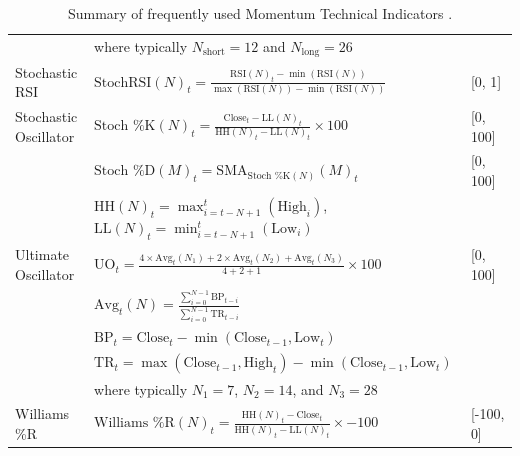 \begin{table}[htb!]
\begin{tabularx}{\textwidth}{@{}lXl@{}}
\addlinespace
& where typically $N_{\text{short}} = 12$ and $N_{\text{long}} = 26$ & \\
\addlinespace
Stochastic RSI & $\text{StochRSI}(N)_t = \frac{\text{RSI}(N)_t - \min(\text{RSI}(N))}{\max(\text{RSI}(N)) - \min(\text{RSI}(N))}$ & [0, 1] \\
\addlinespace
Stochastic Oscillator & $\text{Stoch \%K}(N)_t = \frac{\text{Close}_t - \text{LL}(N)_t}{\text{HH}(N)_t - \text{LL}(N)_t} \times 100$ & [0, 100] \\
\addlinespace
& $\text{Stoch \%D}(M)_t = \text{SMA}_{\text{Stoch \%K}(N)}(M)_t$ & [0, 100] \\
\addlinespace
& $\text{HH}(N)_t = \max_{i=t-N+1}^{t}(\text{High}_i)$, $\text{LL}(N)_t = \min_{i=t-N+1}^{t}(\text{Low}_i)$ & \\
\addlinespace
Ultimate Oscillator & $\text{UO}_t = \frac{4 \times \text{Avg}_t(N_1) + 2 \times \text{Avg}_t(N_2) + \text{Avg}_t(N_3)}{4+2+1} \times 100$ & [0, 100] \\
\addlinespace
& $\text{Avg}_t(N) = \frac{\sum_{i=0}^{N-1}\text{BP}_{t-i}}{\sum_{i=0}^{N-1}\text{TR}_{t-i}}$ & \\
\addlinespace
& $\text{BP}_t = \text{Close}_t - \min(\text{Close}_{t-1}, \text{Low}_t)$ & \\
\addlinespace
& $\text{TR}_t = \max(\text{Close}_{t-1}, \text{High}_t) - \min(\text{Close}_{t-1}, \text{Low}_t)$ & \\
\addlinespace
& where typically $N_1 = 7$, $N_2 = 14$, and $N_3 = 28$ & \\
\addlinespace
Williams \%R & $\text{Williams \%R}(N)_t = \frac{\text{HH}(N)_t - \text{Close}_t}{\text{HH}(N)_t - \text{LL}(N)_t} \times -100$ & [-100, 0] \\
\bottomrule
\end{tabularx}
\caption{Summary of frequently used Momentum Technical Indicators \cite{jansen_machine_2020}.}
\label{Tables:MomentumIndicators}
\end{table}